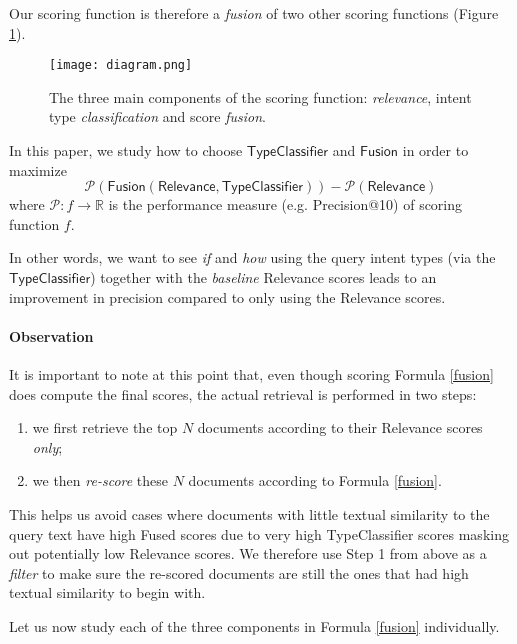 Our scoring function is therefore a \emph{fusion} of two other scoring functions (Figure \ref{diagram}).

\begin{figure}[h!]
\centerline{
  \texttt{[image: diagram.png]}
  }
  \caption{The three main components of the scoring function:
  \emph{relevance}, intent type \emph{classification} and score \emph{fusion}.}
  \label{diagram}
\end{figure}

In this paper, we study how to choose $\textsf{TypeClassifier}$ and $\textsf{Fusion}$ in order to maximize
\[
 \mathcal{P}(\textsf{Fusion}(\textsf{Relevance}, \textsf{TypeClassifier})) - \mathcal{P}(\textsf{Relevance})
\]
where $\mathcal{P}: f \rightarrow \mathbb{R}$ is the performance measure (e.g. Precision@10) of scoring function $f$.

In other words, we want to see \emph{if} and \emph{how} using the query intent types (via the
$\textsf{TypeClassifier}$) together with the \emph{baseline} \textsf{Relevance} scores
leads to an improvement in precision compared to only using the \textsf{Relevance} scores.

\paragraph{Observation} It is important to note at this point that, even though scoring Formula \ref{fusion} does
compute the final scores,
the actual retrieval is performed in two steps:
\begin{enumerate}
 \item we first retrieve the top $N$ documents according to their \textsf{Relevance} scores \emph{only};
 \vspace{-0.2cm}
 \item we then \emph{re-score} these $N$ documents according to Formula \ref{fusion}.
\end{enumerate}
This helps us avoid cases where documents with little textual similarity to the query text
have high \textsf{Fused} scores due to very high \textsf{TypeClassifier} scores masking out potentially low \textsf{Relevance} scores.
We therefore use Step 1 from above as a \emph{filter} to make sure the re-scored documents are still the ones that had high textual
similarity to begin with.

Let us now study each of the three components in Formula \ref{fusion} individually.

